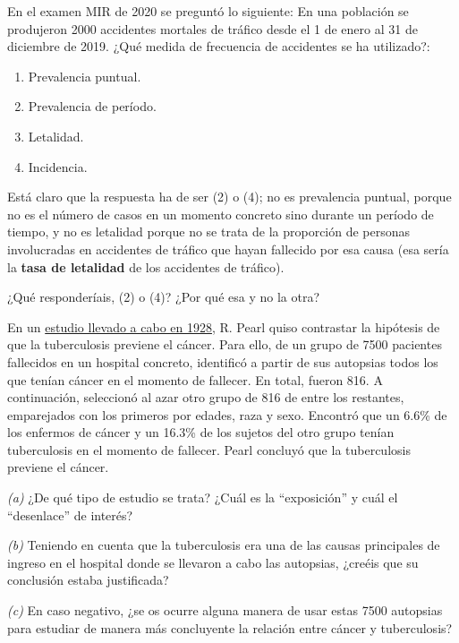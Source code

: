 \documentclass[
]{book}
\providecommand{\tightlist}{%
  \setlength{\itemsep}{0pt}\setlength{\parskip}{0pt}}
\theoremstyle{definition}
\theoremstyle{definition}
\theoremstyle{definition}
\theoremstyle{definition}
\theoremstyle{remark}
\begin{document}
\begin{rmdexercici}
En el examen MIR de 2020 se preguntó lo siguiente: En una población se produjeron 2000 accidentes mortales de tráfico desde el 1 de enero al 31 de diciembre de 2019. ¿Qué medida de frecuencia de accidentes se ha utilizado?:

\begin{enumerate}
\def\labelenumi{\arabic{enumi}.}
\tightlist
\item
  Prevalencia puntual.
\item
  Prevalencia de período.
\item
  Letalidad.
\item
  Incidencia.
\end{enumerate}

Está claro que la respuesta ha de ser (2) o (4); no es prevalencia puntual, porque no es el número de casos en un momento concreto sino durante un período de tiempo, y no es letalidad porque no se trata de la proporción de personas involucradas en accidentes de tráfico que hayan fallecido por esa causa (esa sería la \textbf{tasa de letalidad} de los accidentes de tráfico).

¿Qué responderíais, (2) o (4)? ¿Por qué esa y no la otra?
\end{rmdexercici}

\begin{rmdexercici}
En un \href{https://journals.sagepub.com/doi/abs/10.3181/00379727-26-4143?journalCode=ebma}{estudio llevado a cabo en 1928}, R. Pearl quiso contrastar la hipótesis de que la tuberculosis previene el cáncer. Para ello, de un grupo de 7500 pacientes fallecidos en un hospital concreto, identificó a partir de sus autopsias todos los que tenían cáncer en el momento de fallecer. En total, fueron 816. A continuación, seleccionó al azar otro grupo de 816 de entre los restantes, emparejados con los primeros por edades, raza y sexo. Encontró que un 6.6\% de los enfermos de cáncer y un 16.3\% de los sujetos del otro grupo tenían tuberculosis en el momento de fallecer. Pearl concluyó que la tuberculosis previene el cáncer.

\emph{(a)} ¿De qué tipo de estudio se trata? ¿Cuál es la ``exposición'' y cuál el ``desenlace'' de interés?

\emph{(b)} Teniendo en cuenta que la tuberculosis era una de las causas principales de ingreso en el hospital donde se llevaron a cabo las autopsias, ¿creéis que su conclusión estaba justificada?

\emph{(c)} En caso negativo, ¿se os ocurre alguna manera de usar estas 7500 autopsias para estudiar de manera más concluyente la relación entre cáncer y tuberculosis?
\end{rmdexercici}
\end{document}
